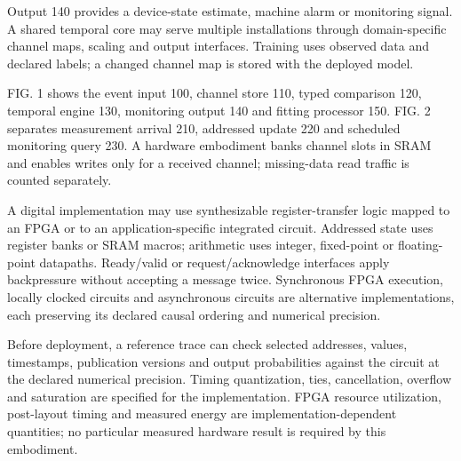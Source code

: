 \documentclass[pct]{sm-patent}
\begin{document}
\pnum Output 140 provides a device-state estimate, machine alarm or monitoring signal. A shared temporal core may serve multiple installations through domain-specific channel maps, scaling and output interfaces. Training uses observed data and declared labels; a changed channel map is stored with the deployed model.

\pnum FIG. 1 shows the event input 100, channel store 110, typed comparison 120, temporal engine 130, monitoring output 140 and fitting processor 150. FIG. 2 separates measurement arrival 210, addressed update 220 and scheduled monitoring query 230. A hardware embodiment banks channel slots in SRAM and enables writes only for a received channel; missing-data read traffic is counted separately.


\pnum A digital implementation may use synthesizable register-transfer logic mapped to an FPGA or to an application-specific integrated circuit. Addressed state uses register banks or SRAM macros; arithmetic uses integer, fixed-point or floating-point datapaths. Ready/valid or request/acknowledge interfaces apply backpressure without accepting a message twice. Synchronous FPGA execution, locally clocked circuits and asynchronous circuits are alternative implementations, each preserving its declared causal ordering and numerical precision.

\pnum Before deployment, a reference trace can check selected addresses, values, timestamps, publication versions and output probabilities against the circuit at the declared numerical precision. Timing quantization, ties, cancellation, overflow and saturation are specified for the implementation. FPGA resource utilization, post-layout timing and measured energy are implementation-dependent quantities; no particular measured hardware result is required by this embodiment.

\claimsstart
\end{document}

